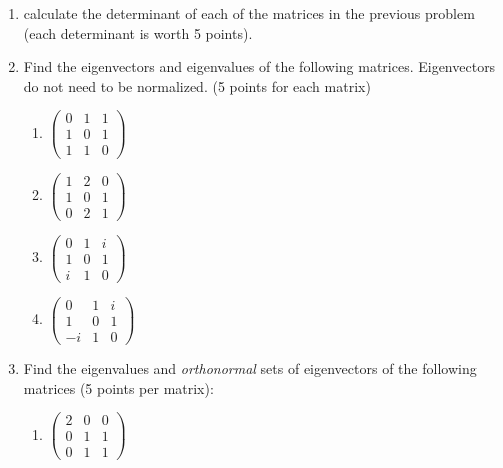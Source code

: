\documentclass[fleqn]{article}
\begin{document}
\begin{enumerate}
  \item calculate the determinant of each of the matrices in the previous problem (each determinant is worth 5 points). 


  \item Find the eigenvectors and eigenvalues of the
    following matrices.  Eigenvectors do not need to be normalized. (5 points for each matrix)
    
  \begin{enumerate}
  \item  $\left( 
    \begin{array}{rrr}
    0 & 1 & 1 \\ 
    1 & 0 & 1 \\ 
    1 & 1 & 0
    \end{array}
    \right) $
    
    \item  $\left( 
    \begin{array}{rrr}
    1 & 2 & 0 \\ 
    1 & 0 & 1 \\ 
    0 & 2 & 1
    \end{array}
    \right) $
    
    \item  $\left( 
    \begin{array}{rrr}
    0 & 1 & i \\ 
    1 & 0 & 1 \\ 
    i & 1 & 0
    \end{array}
    \right) $
    
    \item  $\left( 
    \begin{array}{rrr}
    0 & 1 & i \\ 
    1 & 0 & 1 \\ 
    -i & 1 & 0
    \end{array}
    \right) $
    \end{enumerate}
    
    
  \item Find the eigenvalues and \emph{orthonormal} sets of eigenvectors of the following matrices (5 points per matrix):
    
  \begin{enumerate}
    \item  $\left( 
    \begin{array}{rrr}
    2 & 0 & 0 \\ 
    0 & 1 & 1 \\ 
    0 & 1 & 1
    \end{array}
    \right) $
    

\end{enumerate}
\end{enumerate}
\end{document}
